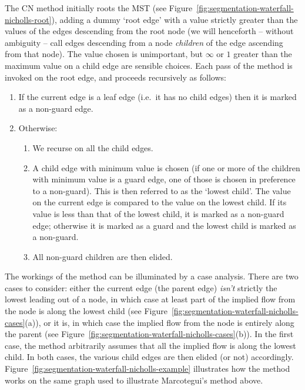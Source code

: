 \documentclass[a4paper]{article}
\begin{document}
The CN method initially roots the MST (see Figure~\ref{fig:segmentation-waterfall-nicholls-root}), adding a dummy `root edge' with a value strictly greater than the values of the edges descending from the root node (we will henceforth -- without ambiguity -- call edges descending from a node \emph{children} of the edge ascending from that node). The value chosen is unimportant, but $\infty$ or $1$ greater than the maximum value on a child edge are sensible choices. Each pass of the method is invoked on the root edge, and proceeds recursively as follows:
%
\begin{enumerate}

\item If the current edge is a leaf edge (i.e.~it has no child edges) then it is marked as a non-guard edge.

\item Otherwise:

\begin{enumerate}

\item We recurse on all the child edges.

\item A child edge with minimum value is chosen (if one or more of the children with minimum value is a guard edge, one of those is chosen in preference to a non-guard). This is then referred to as the `lowest child'. The value on the current edge is compared to the value on the lowest child. If its value is less than that of the lowest child, it is marked as a non-guard edge; otherwise it is marked as a guard and the lowest child is marked as a non-guard.

\item All non-guard children are then elided.

\end{enumerate}

\end{enumerate}

\noindent The workings of the method can be illuminated by a case analysis. There are two cases to consider: either the current edge (the parent edge) \emph{isn't} strictly the lowest leading out of a node, in which case at least part of the implied flow from the node is along the lowest child (see Figure~\ref{fig:segmentation-waterfall-nicholls-cases}(a)), or it is, in which case the implied flow from the node is entirely along the parent (see Figure~\ref{fig:segmentation-waterfall-nicholls-cases}(b)). In the first case, the method arbitrarily assumes that all the implied flow is along the lowest child. In both cases, the various child edges are then elided (or not) accordingly. Figure~\ref{fig:segmentation-waterfall-nicholls-example} illustrates how the method works on the same graph used to illustrate Marcotegui's method above.
\end{document}
